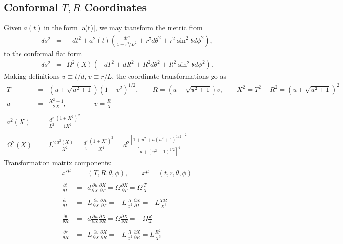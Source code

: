 \documentclass[10pt,letterpaper]{article}
\numberwithin{equation}{section}
\begin{document}
\subsection{Conformal $T,R$ Coordinates}
Given $a(t)$ in the form \eqref{a(t)}, we may transform the metric from
\begin{eqnarray}
ds^2&=& -dt^2 + a^2(t)\left( \frac{dr^2}{1+r^2/L^2} + r^2d\theta^2 + r^2\sin^2\theta d\phi^2\right),
\end{eqnarray}
to the conformal flat form
\begin{eqnarray}
ds^2&=& \Omega^2(X)( -dT^2+dR^2 + R^2d\theta^2 +R^2\sin^2\theta d\phi^2).
\end{eqnarray}
Making definitions $u \equiv t/d$, $v \equiv r/L$, the coordinate transformations go as
\begin{eqnarray}
T &=& \left( u+ \sqrt{u^2+1}\right) \left(1+ v^2\right)^{1/2},\qquad
R = \left( u+ \sqrt{u^2+1}\right)v,\qquad
X^2 = T^2-R^2 = \left(u + \sqrt{u^2+1}\right)^2
\nonumber\\
u &=& \frac{X^2-1}{2X},\qquad\qquad v = \frac{R}{X}
\\ \nonumber\\
a^2(X) &=& \frac{d^2}{L^2} \frac{(1+X^2)^2}{4X^2}
\\ \nonumber\\
\Omega^2(X) &=& L^2 \frac{a^2(X)}{X^2} = \frac{d^2}{4}\frac{(1+X^2)^2}{X^4} = d^2 \frac{[1+u^2+ u(u^2+1)^{1/2}]^2}{[u+(u^2+1)^{1/2}]^4}
\end{eqnarray}
Transformation matrix components:
\begin{eqnarray}
x'^\mu &=& (T,R,\theta,\phi),\qquad x^\mu = (t,r,\theta,\phi)
\\ \nonumber\\
\frac{\partial t}{\partial T} &=& d \frac{\partial u}{\partial X}\frac{\partial X}{\partial T} = \Omega\frac{\partial X}{\partial T} = \Omega\frac{T}{X} 
\\ \nonumber\\
\frac{\partial r}{\partial T} &=& L \frac{\partial v}{\partial X}\frac{\partial X}{\partial T} = -L\frac{R}{X^2}\frac{\partial X}{\partial T} = -L \frac{TR}{X^3}
\\ \nonumber\\
\frac{\partial t}{\partial R} &=& d \frac{\partial u}{\partial X}\frac{\partial X}{\partial R} = \Omega\frac{\partial X}{\partial R} =-\Omega \frac{R}{X}
\\ \nonumber\\
\frac{\partial r}{\partial R} &=& L \frac{\partial v}{\partial X}\frac{\partial X}{\partial R} = -L\frac{R}{X^2}\frac{\partial X}{\partial R} = L \frac{R^2}{X^3}
\end{eqnarray}
%
%
%
\\ \\
\end{document}
